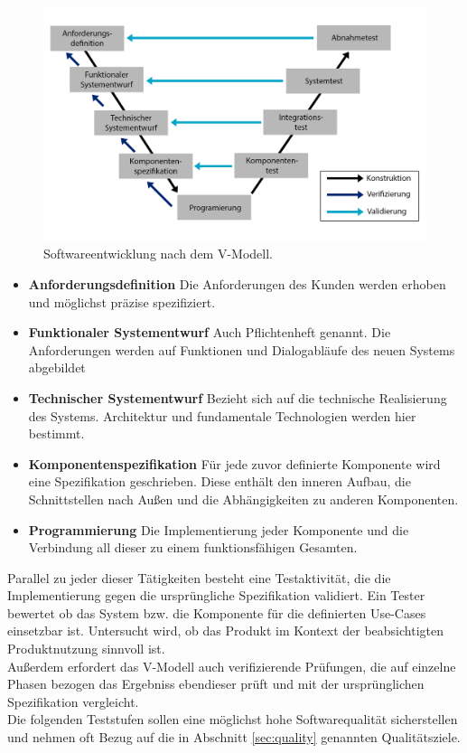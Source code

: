 \begin{figure}[h] 
  \centering
     \includegraphics[width=1\textwidth]{figures/v_modell.png}
  \caption{Softwareentwicklung nach dem V-Modell.}
  \label{fig:v_modell}
\end{figure}


\begin{itemize}
\item \textbf{Anforderungsdefinition} Die Anforderungen des Kunden werden erhoben und möglichst präzise spezifiziert.
\item \textbf{Funktionaler Systementwurf} Auch Pflichtenheft genannt. Die Anforderungen werden auf Funktionen und Dialogabläufe des neuen Systems abgebildet\cite{spillner_basiswissen_2012}
\item \textbf{Technischer Systementwurf} Bezieht sich auf die technische Realisierung des Systems. Architektur und fundamentale Technologien werden hier bestimmt.
\item \textbf{Komponentenspezifikation} Für jede zuvor definierte Komponente wird eine Spezifikation geschrieben. Diese enthält den inneren Aufbau, die Schnittstellen nach Außen und die Abhängigkeiten zu anderen Komponenten.
\item \textbf{Programmierung} Die Implementierung jeder Komponente und die Verbindung all dieser zu einem funktionsfähigen Gesamten.
\end{itemize}

Parallel zu jeder dieser Tätigkeiten besteht eine Testaktivität, die die Implementierung gegen die ursprüngliche Spezifikation validiert. Ein Tester bewertet ob das System bzw. die Komponente für die definierten Use-Cases einsetzbar ist. Untersucht wird, ob das Produkt im Kontext der beabsichtigten Produktnutzung sinnvoll ist\cite{spillner_basiswissen_2012}.\\
Außerdem erfordert das V-Modell auch verifizierende Prüfungen, die auf einzelne Phasen bezogen das Ergebniss ebendieser prüft und mit der ursprünglichen Spezifikation vergleicht.\\
Die folgenden Teststufen sollen eine möglichst hohe Softwarequalität sicherstellen und nehmen oft Bezug auf die in Abschnitt \ref{sec:quality} genannten Qualitätsziele.

